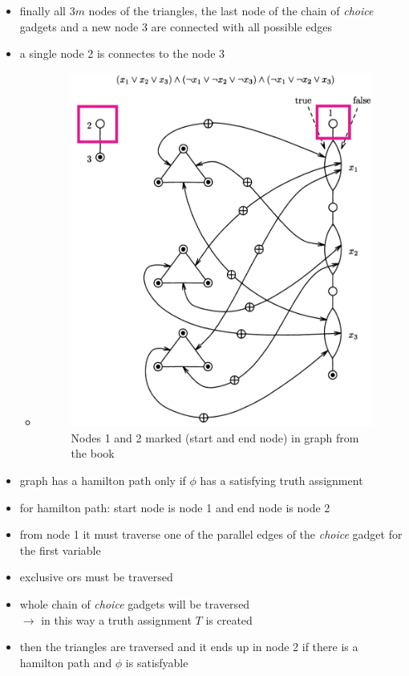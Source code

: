 \documentclass[a4]{scrartcl}
\begin{document}
\begin{itemize}
\item finally all $3m$ nodes of the triangles, the last node of the chain of \textit{choice} gadgets and a new node 3 are connected with all possible edges
\item a single node 2 is connectes to the node 3 \\
\begin{itemize}
\item[]
\begin{figure}[H]
\begin{center}
\includegraphics[scale=0.4]{12.jpg}
\end{center}
\caption{Nodes 1 and 2 marked (start and end node) in graph from the book \cite{book}}
\end{figure}
\end{itemize}

\item graph has a hamilton path only if $\phi$ has a satisfying truth assignment
\item for hamilton path: start node is node 1 and end node is node 2
\item from node 1 it must traverse one of the parallel edges of the \textit{choice} gadget for the first variable
\item exclusive ors must be traversed
\item whole chain of \textit{choice} gadgets will be traversed \\
$\rightarrow$ in this way a truth assignment $T$ is created
\item then the triangles are traversed and it ends up in node 2 if there is a hamilton path and $\phi$ is satisfyable


\end{itemize}
\end{document}

